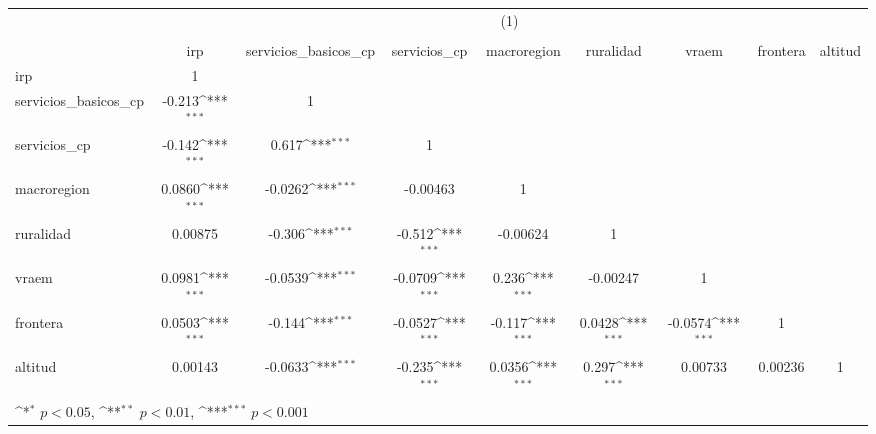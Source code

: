 {
\def\sym#1{\ifmmode^{#1}\else\(^{#1}\)\fi}
\begin{tabular}{l*{8}{c}}
\hline\hline
          &\multicolumn{8}{c}{(1)}                                                                                                                                \\
          &\multicolumn{8}{c}{}                                                                                                                                   \\
          &      irp         &servicios\_basicos\_cp         &servicios\_cp         &macroregion         &ruralidad         &    vraem         & frontera         &  altitud         \\
\hline
irp       &        1         &                  &                  &                  &                  &                  &                  &                  \\
servicios\_basicos\_cp&   -0.213\sym{***}&        1         &                  &                  &                  &                  &                  &                  \\
servicios\_cp&   -0.142\sym{***}&    0.617\sym{***}&        1         &                  &                  &                  &                  &                  \\
macroregion&   0.0860\sym{***}&  -0.0262\sym{***}& -0.00463         &        1         &                  &                  &                  &                  \\
ruralidad &  0.00875         &   -0.306\sym{***}&   -0.512\sym{***}& -0.00624         &        1         &                  &                  &                  \\
vraem     &   0.0981\sym{***}&  -0.0539\sym{***}&  -0.0709\sym{***}&    0.236\sym{***}& -0.00247         &        1         &                  &                  \\
frontera  &   0.0503\sym{***}&   -0.144\sym{***}&  -0.0527\sym{***}&   -0.117\sym{***}&   0.0428\sym{***}&  -0.0574\sym{***}&        1         &                  \\
altitud   &  0.00143         &  -0.0633\sym{***}&   -0.235\sym{***}&   0.0356\sym{***}&    0.297\sym{***}&  0.00733         &  0.00236         &        1         \\
\hline\hline
\multicolumn{9}{l}{\footnotesize \sym{*} \(p<0.05\), \sym{**} \(p<0.01\), \sym{***} \(p<0.001\)}\\
\end{tabular}
}
